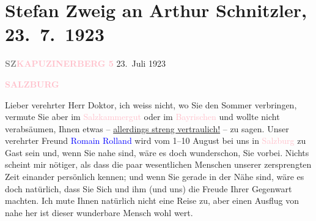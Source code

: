 

\renewcommand{\erwaehntePersonen}{Personen: Romain Rolland, Stefan Zweig}
\renewcommand{\erwaehnteOrte}{Orte: Bayern, Paschinger Schlössl, Salzburg, Salzkammergut, Wien}
\renewcommand{\erwaehnteWerke}{}
\section[Stefan Zweig an Arthur Schnitzler, 23. 7. 1923]{Stefan Zweig an Arthur Schnitzler, 23. 7. 1923}
\nopagebreak{}
\rehead{ }\normalsize\beginnumbering{}
\toendnotes[C]{\smallbreak\pagebreak[2]}
\toendnotes[C]{\smallbreak}
\pstart
           {\pb}\textcolor{gray}{\textbf{SZ}}\hfill \textcolor{gray}{\textbf{\textcolor{pink}{KAPUZINERBERG 5}{}\ledrightnote{\textcolor{pink}{Paschinger Schlössl}}}}{ }23. Juli 1923\pend
           
\pstart
           \raggedleft{}\textcolor{gray}{\textbf{\textcolor{pink}{SALZBURG}{}\ledrightnote{\textcolor{pink}{Salzburg}}}}\pend
           
\pstart
           Lieber verehrter Herr Doktor, ich weiss nicht, wo Sie den Sommer
               verbringen, vermute Sie aber im \textcolor{pink}{Salzkammergut}{}\ledrightnote{\textcolor{pink}{Salzkammergut}}
               oder im \textcolor{pink}{Bayrischen}{}\ledrightnote{\textcolor{pink}{Bayern}} und wollte nicht verabsäumen,
               Ihnen etwas – \uline{allerdings streng vertraulich!} – zu
               sagen. Unser verehrter Freund \textcolor{blue}{Romain Rolland}{}\ledrightnote{\textcolor{blue}{Romain Rolland}}
               wird vom 1–10 August bei uns in \textcolor{pink}{Salzburg}{}\ledrightnote{\textcolor{pink}{Salzburg}} zu Gast sein und, wenn Sie nahe sind, wäre es doch
               wunderschon, Sie \label{K_L03667-1v}\label{K_L03667-1h} vorbei. Nichts scheint mir nötiger, als dass die
               paar wesentlichen Menschen unserer zersprengten Zeit einander persönlich kennen; und
               wenn Sie gerade in der Nähe sind, wäre es doch natürlich, dass Sie Sich und ihm (und
               uns) die Freude Ihrer Gegenwart machten. Ich mute Ihnen natürlich nicht eine Reise
               zu, aber einen Ausflug von nahe her ist dieser wunderbare Mensch wohl wert. \pend
           
